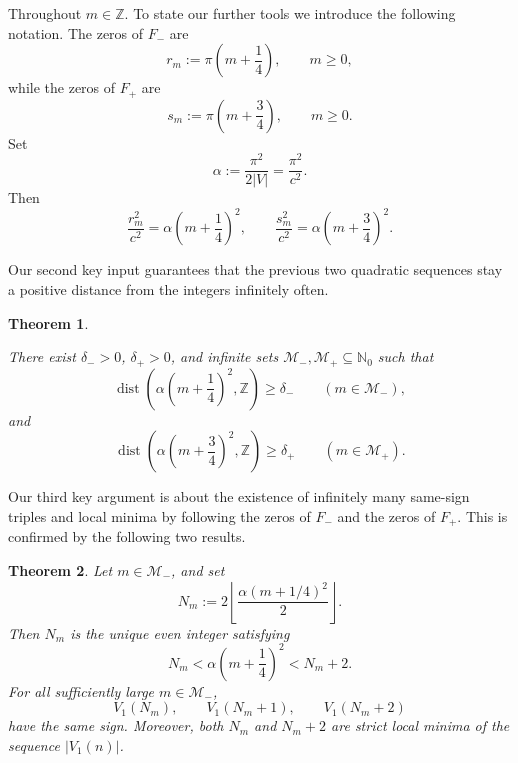 \documentclass[reqno]{amsart}
\theoremstyle{definition}
\theoremstyle{plain}
\newtheorem{theorem}    {Theorem}
\theoremstyle{remark}
\numberwithin{equation}{section}
\newcommand{\Z}{\mathbb{Z}}
\newcommand{\N}{\mathbb{N}}
\newcommand{\dist}{\operatorname{dist}}
\begin{document}
Throughout $m\in\mathbb{Z}$. To state our further tools we introduce the following notation.  
The zeros of $F_-$ are
\begin{equation}\label{eq:rminus}
  r_m:=\pi\left(m+\frac14\right),\qquad m\ge 0,
\end{equation}
while the zeros of $F_+$ are
\begin{equation}\label{eq:rplus}
  s_m:=\pi\left(m+\frac34\right),\qquad m\ge 0.
\end{equation}
Set
\begin{equation}\label{eq:alpha}
  \alpha:=\frac{\pi^2}{2|V|}=\frac{\pi^2}{c^2}.
\end{equation}
Then
\begin{equation}\label{eq:t-seqs}
  \frac{r_m^2}{c^2}=\alpha\left(m+\frac14\right)^2,
  \qquad
  \frac{s_m^2}{c^2}=\alpha\left(m+\frac34\right)^2.
\end{equation}

Our second key input guarantees that the previous two quadratic sequences stay a positive distance from the integers infinitely often.

\begin{theorem}\label{thm:good-subseq}

There exist $\delta_->0$, $\delta_+>0$, and infinite sets $\mathcal M_-,\mathcal M_+\subseteq \N_0$ such that
\begin{equation}\label{eq:good-distances}
  \dist\!\left(\alpha\left(m+\frac14\right)^2,\Z\right)\ge \delta_-
  \qquad (m\in \mathcal M_-),
\end{equation}
and
\begin{equation}\label{eq:good-distances-plus}
  \dist\!\left(\alpha\left(m+\frac34\right)^2,\Z\right)\ge \delta_+
  \qquad (m\in \mathcal M_+).
\end{equation}
\end{theorem}

Our third key argument is about the existence of infinitely many same-sign triples and local minima by following the zeros of $F_-$ and the zeros of $F_+$.
This is confirmed by the following two results.

\begin{theorem}\label{thm:minus-family}
Let $m\in \mathcal M_-$, and set
\[
  N_m:=2\left\lfloor \frac{\alpha(m+1/4)^2}{2}\right\rfloor.
\]
Then $N_m$ is the unique even integer satisfying
\begin{equation}\label{eq:Nm-def}
  N_m<\alpha\left(m+\frac14\right)^2<N_m+2.
\end{equation}
For all sufficiently large $m\in \mathcal M_-$,
\[
  V_1(N_m),\qquad V_1(N_m+1),\qquad V_1(N_m+2)
\]
have the same sign. Moreover, both $N_m$ and $N_m+2$ are strict local minima of the sequence $|V_1(n)|$.
\end{theorem}
\end{document}
